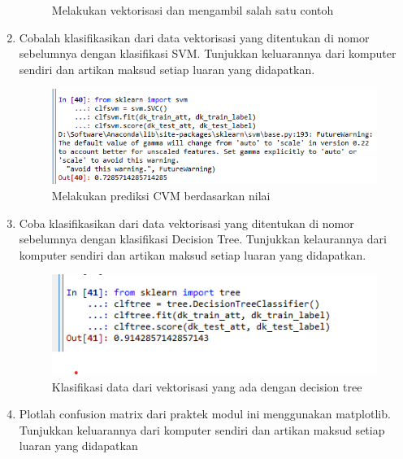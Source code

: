 \begin{enumerate}
\begin{figure}[ht]
        \caption{Melakukan vektorisasi dan mengambil salah satu contoh}
        \label{contoh6}
    \end{figure}
    \item Cobalah klasifikasikan dari data vektorisasi yang ditentukan di nomor sebelumnya dengan klasifikasi SVM. Tunjukkan keluarannya dari komputer sendiri dan artikan maksud setiap luaran yang didapatkan.
    
    \begin{figure}[ht]
        \centering
        \includegraphics[scale=0.2]{figures/1174035/chapter4/4_praktek.png}
        \caption{Melakukan prediksi CVM berdasarkan nilai}
        \label{contoh7}
    \end{figure}
    \item Coba klasifikasikan dari data vektorisasi yang ditentukan di nomor sebelumnya dengan klasifikasi Decision Tree. Tunjukkan kelaurannya dari komputer sendiri dan artikan maksud setiap luaran yang didapatkan.
    
    \begin{figure}[ht]
        \centering
        \includegraphics[scale=0.2]{figures/1174035/chapter4/5_praktek.png}
        \caption{Klasifikasi data dari vektorisasi yang ada dengan decision tree}
        \label{contoh8}
    \end{figure}
    \item Plotlah confusion matrix dari praktek modul ini menggunakan matplotlib. Tunjukkan keluarannya dari komputer sendiri dan artikan maksud setiap luaran yang didapatkan
    
    \begin{figure}[ht]
        \centering

\end{figure}
\end{enumerate}
